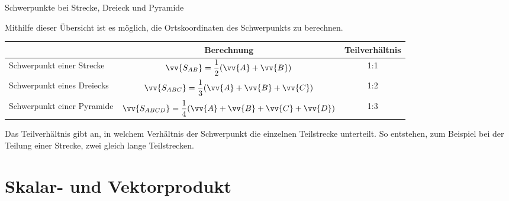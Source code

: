 \begin{merke}{Schwerpunkte bei Strecke, Dreieck und Pyramide}{}
\begin{center}
Mithilfe dieser Übersicht ist es möglich, die Ortskoordinaten des Schwerpunkts zu berechnen.\\[0.5cm]
\bgroup
\def\arraystretch{1.5}%
\begin{tabular}{|l|c|c|}
    \hline
    & Berechnung & Teilverhältnis \\[0.2cm]
     \hline
     \hline
     Schwerpunkt einer Strecke & $\vv{S_{AB}} = \dfrac{1}{2}(\vv{A} + \vv{B})$ & 1:1\\[0.2cm]
     \hline
     Schwerpunkt eines Dreiecks &$ \vv{S_{ABC}} = \dfrac{1}{3} (\vv{A} + \vv{B} + \vv{C})$ & 1:2\\[0.2cm]
     \hline
     Schwerpunkt einer Pyramide & $\vv{S_{ABCD}} = \dfrac{1}{4}(\vv{A} + \vv{B} +\vv{C} + \vv{D})$ & 1:3\\[0.2cm]
     \hline
\end{tabular}
\egroup
\end{center}
Das Teilverhältnis gibt an, in welchem Verhältnis der Schwerpunkt die einzelnen Teilstrecke unterteilt. So entstehen, zum Beispiel bei der Teilung einer Strecke, zwei gleich lange Teilstrecken.
\end{merke}
\section{Skalar- und Vektorprodukt}
